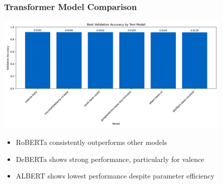 \begin{frame}
\frametitle{Transformer Model Comparison}
\begin{center}
\includegraphics[width=0.85\textwidth]{figures/text_model_comparison.png}
\end{center}

\begin{itemize}
    \item RoBERTa consistently outperforms other models
    \item DeBERTa shows strong performance, particularly for valence
    \item ALBERT shows lowest performance despite parameter efficiency
\end{itemize}
\end{frame}

